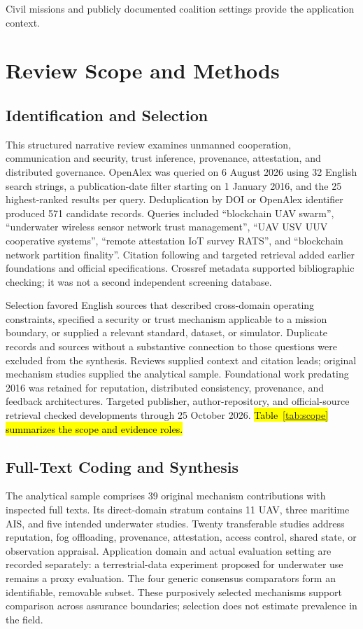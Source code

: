 \documentclass[blockchains,review,accept,moreauthors]{Definitions/mdpi}
\begin{document}
Civil missions and publicly documented coalition settings provide the application context.


\section{Review Scope and Methods}\label{sec:scope}

\subsection{Identification and Selection}

This structured narrative review examines unmanned cooperation, communication and security, trust inference, provenance, attestation, and distributed governance. OpenAlex was queried on 6 August 2026 using 32 English search strings, a publication-date filter starting on 1 January 2016, and the 25 highest-ranked results per query. Deduplication by DOI or OpenAlex identifier produced 571 candidate records. Queries included ``blockchain UAV swarm'', ``underwater wireless sensor network trust management'', ``UAV USV UUV cooperative systems'', ``remote attestation IoT survey RATS'', and ``blockchain network partition finality''. Citation following and targeted retrieval added earlier foundations and official specifications. Crossref metadata supported bibliographic checking; it was not a second independent screening database.

Selection favored English sources that described cross-domain operating constraints, specified a security or trust mechanism applicable to a mission boundary, or supplied a relevant standard, dataset, or simulator. Duplicate records and sources without a substantive connection to those questions were excluded from the synthesis. Reviews supplied context and citation leads; original mechanism studies supplied the analytical sample. Foundational work predating 2016 was retained for reputation, distributed consistency, provenance, and feedback architectures. Targeted publisher, author-repository, and official-source retrieval checked developments through 25 October 2026. \hl{Table~{\ref{tab:scope}} summarizes the scope and evidence roles.}

\subsection{Full-Text Coding and Synthesis}\label{sec:coding}

The analytical sample comprises 39 original mechanism contributions with inspected full texts. Its direct-domain stratum contains 11 UAV, three maritime AIS, and five intended underwater studies. Twenty transferable studies address reputation, fog offloading, provenance, attestation, access control, shared state, or observation appraisal. Application domain and actual evaluation setting are recorded separately: a terrestrial-data experiment proposed for underwater use remains a proxy evaluation. The four generic consensus comparators form an identifiable, removable subset. These purposively selected mechanisms support comparison across assurance boundaries; selection does not estimate prevalence in the field.
\end{document}
